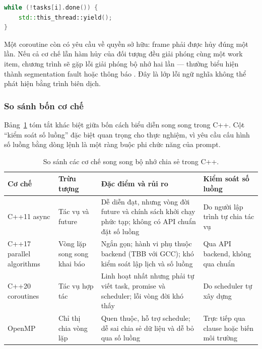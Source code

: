 \begin{lstlisting}[language=C++,caption={Vòng lặp chờ \code{done()} không bao giờ kết thúc khi \code{final\_suspend} là \code{suspend\_never}.},label={lst:corobug}]
while (!tasks[i].done()) {
    std::this_thread::yield();
}
\end{lstlisting}

Một coroutine còn có yêu cầu về quyền sở hữu: frame phải được hủy đúng một lần.
Nếu cả cơ chế  lẫn hàm hủy của đối tượng  đều
giải phóng cùng một work item, chương trình sẽ gặp lỗi giải phóng bộ nhớ hai lần
— thường biểu hiện thành segmentation fault hoặc thông báo
. Đây là lớp lỗi ngữ nghĩa không thể phát hiện bằng
trình biên dịch.

\subsubsection{So sánh bốn cơ chế}

Bảng~\ref{tab:cppmodels} tóm tắt khác biệt giữa bốn cách biểu diễn song song
trong C++. Cột “kiểm soát số luồng” đặc biệt quan trọng cho thực nghiệm, vì yêu
cầu cấu hình số luồng bằng dòng lệnh là một ràng buộc phi chức năng của prompt.

\begin{table}[H]
\centering
\small
\caption{So sánh các cơ chế song song bộ nhớ chia sẻ trong C++.}
\label{tab:cppmodels}
\begin{tabularx}{\textwidth}{@{}p{2.9cm} p{3.0cm} X p{2.6cm}@{}}
\toprule
\textbf{Cơ chế} & \textbf{Trừu tượng} & \textbf{Đặc điểm và rủi ro} & \textbf{Kiểm soát số luồng} \\
\midrule
C++11 async & Tác vụ và future & Dễ diễn đạt, nhưng vòng đời future và chính sách khởi chạy phức tạp; không có API chuẩn đặt số luồng & Do người lập trình tự chia tác vụ \\
C++17 parallel algorithms & Vòng lặp song song khai báo & Ngắn gọn; hành vi phụ thuộc backend (TBB với GCC); khó kiểm soát lập lịch và số luồng & Qua API backend, không qua chuẩn \\
C++20 coroutines & Tác vụ hợp tác & Linh hoạt nhất nhưng phải tự viết task, promise và scheduler; lỗi vòng đời khó thấy & Do scheduler tự xây dựng \\
OpenMP & Chỉ thị chia vòng lặp & Quen thuộc, hỗ trợ schedule; dễ sai chia sẻ dữ liệu và dễ bỏ qua số luồng & Trực tiếp qua clause hoặc biến môi trường \\
\bottomrule
\end{tabularx}
\end{table}

